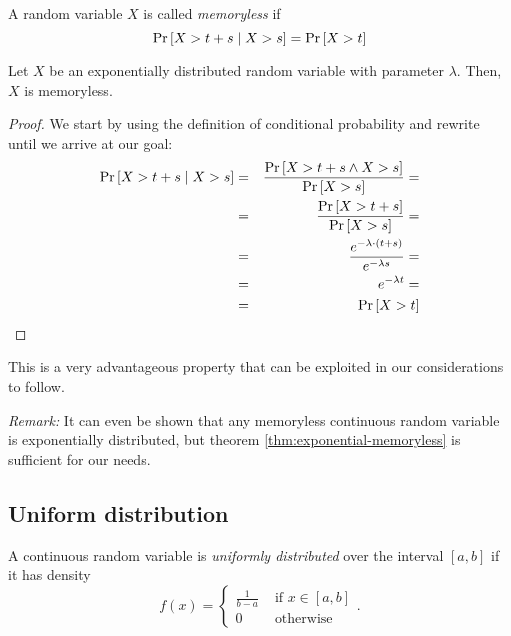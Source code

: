 \begin{definition}[Memorylessness]
  A random variable $X$ is called \emph{memoryless} if
  \begin{equation*}
    \operatorname{Pr}\left[X>t+s \mid X>s\right] = \operatorname{Pr}\left[X > t\right]
  \end{equation*}
\end{definition}

\begin{theorem}
  \label{thm:exponential-memoryless}
  Let $X$ be an exponentially distributed random variable with parameter $\lambda$. Then, $X$ is memoryless.
\end{theorem}

\begin{proof}
  We start by using the definition of conditional probability and rewrite until we arrive at our goal:
  \begin{eqnarray*}
    \operatorname{Pr}\left[X>t+s \mid X>s\right] &=& \frac{\operatorname{Pr}\left[X>t+s \wedge X>s\right]}{\operatorname{Pr}\left[X>s\right]} = \\
    &=& \frac{\operatorname{Pr}\left[X>t+s\right]}{\operatorname{Pr}\left[X>s\right]} = \\
    &=& \frac{e^{-\lambda \cdot(t+s)}}{e^{-\lambda s}} = \\
    &=& e^{-\lambda t} = \\
    &=& \operatorname{Pr}\left[X>t\right]
  \end{eqnarray*}
\end{proof}

This is a very advantageous property that can be exploited in our considerations to follow.

\emph{Remark:} It can even be shown that any memoryless continuous random variable is exponentially distributed, but theorem \ref{thm:exponential-memoryless} is sufficient for our needs.

\subsection{Uniform distribution}
\label{sec:uniform-distribution}

\begin{definition}
  A continuous random variable is \emph{uniformly distributed} over the interval $\left[ a,b \right]$ if it has density
  \begin{equation*}
    f(x) =
    \begin{cases}
      \frac{1}{b-a} & \text{ if } x\in\left[ a,b \right] \\
      0 & \text{ otherwise}
    \end{cases}.
  \end{equation*}
\end{definition}

